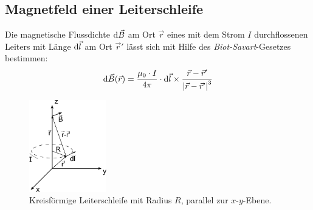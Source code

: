 \subsection{Magnetfeld einer Leiterschleife}
Die magnetische Flussdichte $\mathrm{d} \vec{B}$ am Ort $\vec{r}$ eines mit dem Strom $I$ durchflossenen
Leiters mit Länge $\mathrm{d} \vec{l}$ 
am Ort $\vec{r}'$ lässt sich mit Hilfe des \emph{Biot-Savart}-Gesetzes bestimmen:
\begin{equation}
  \label{eq:biotsavart}
  \mathrm{d} \vec{B}(\vec{r}) = \frac{\mu_0 \cdot I}{4 \pi} \cdot \mathrm{d} \vec{l} \times \frac{\vec{r} - \vec{r}'}{\left|\vec{r} - \vec{r}'\right|^3}
\end{equation} 

\begin{figure}[H]
\begin{center}
  \includegraphics[width=0.3\textwidth]{../img/circloop.pdf}
  \caption{Kreisförmige Leiterschleife mit Radius $R$, parallel zur $x$-$y$-Ebene.}
  \label{img:circloop}
\end{center}
\end{figure}

